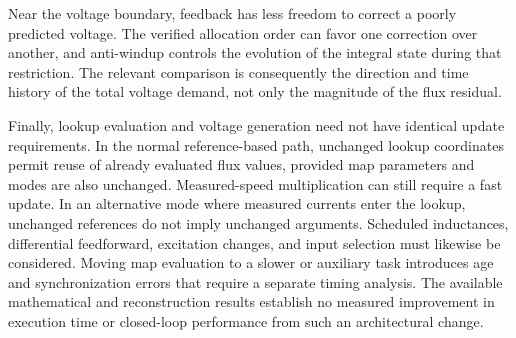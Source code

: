 Near the voltage boundary, feedback has less freedom to correct a poorly predicted voltage. The verified allocation order can favor one correction over another, and anti-windup controls the evolution of the integral state during that restriction. The relevant comparison is consequently the direction and time history of the total voltage demand, not only the magnitude of the flux residual.

Finally, lookup evaluation and voltage generation need not have identical update requirements. In the normal reference-based path, unchanged lookup coordinates permit reuse of already evaluated flux values, provided map parameters and modes are also unchanged. Measured-speed multiplication can still require a fast update. In an alternative mode where measured currents enter the lookup, unchanged references do not imply unchanged arguments. Scheduled inductances, differential feedforward, excitation changes, and input selection must likewise be considered. Moving map evaluation to a slower or auxiliary task introduces age and synchronization errors that require a separate timing analysis. The available mathematical and reconstruction results establish no measured improvement in execution time or closed-loop performance from such an architectural change.
